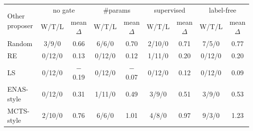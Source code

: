 \begin{tabular}{@{}lcccccccc@{}}
\toprule
\multirow{2}{*}{Other proposer} & \multicolumn{2}{c}{no gate} & \multicolumn{2}{c}{\#params} & \multicolumn{2}{c}{supervised} & \multicolumn{2}{c}{label-free}\\
\cmidrule(lr){2-3}\cmidrule(lr){4-5}\cmidrule(lr){6-7}\cmidrule(lr){8-9}
 & W/T/L & mean $\Delta$ & W/T/L & mean $\Delta$ & W/T/L & mean $\Delta$ & W/T/L & mean $\Delta$\\
\midrule
Random & 3/9/0 & 0.66 & 6/6/0 & 0.70 & 2/10/0 & 0.71 & 7/5/0 & 0.77\\
RE & 0/12/0 & 0.13 & 0/12/0 & 0.12 & 1/11/0 & 0.20 & 0/12/0 & 0.20\\
LS & 0/12/0 & $-$0.19 & 0/12/0 & $-$0.07 & 0/12/0 & 0.12 & 0/12/0 & 0.09\\
ENAS-style & 0/12/0 & 0.31 & 1/11/0 & 0.49 & 3/9/0 & 0.51 & 3/9/0 & 0.53\\
MCTS-style & 2/10/0 & 0.76 & 6/6/0 & 1.01 & 4/8/0 & 0.97 & 9/3/0 & 1.23\\
\bottomrule
\end{tabular}
